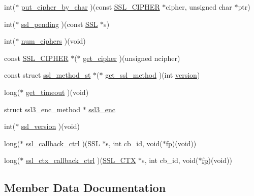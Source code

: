 \begin{DoxyCompactItemize}
int($\ast$ \hyperlink{structssl__method__st_a625829ff35be4426d905e44ea04024cf}{put\+\_\+cipher\+\_\+by\+\_\+char} )(const \hyperlink{ssl_8h_a548d7a5d565a9e0e9bd45c49f8c95701}{S\+S\+L\+\_\+\+C\+I\+P\+H\+ER} $\ast$cipher, unsigned char $\ast$ptr)
\item 
int($\ast$ \hyperlink{structssl__method__st_a8fd510a866d8754bfd60e897ccb8d3b4}{ssl\+\_\+pending} )(const \hyperlink{ossl__typ_8h_a71f21e09bf365489dab9d85bd4785e24}{S\+SL} $\ast$s)
\item 
int($\ast$ \hyperlink{structssl__method__st_ad67301b9f432dca1d82eda0a2a73d402}{num\+\_\+ciphers} )(void)
\item 
const \hyperlink{ssl_8h_a548d7a5d565a9e0e9bd45c49f8c95701}{S\+S\+L\+\_\+\+C\+I\+P\+H\+ER} $\ast$($\ast$ \hyperlink{structssl__method__st_aa5b037fbac753dc98291d099d817a072}{get\+\_\+cipher} )(unsigned ncipher)
\item 
const struct \hyperlink{structssl__method__st}{ssl\+\_\+method\+\_\+st} $\ast$($\ast$ \hyperlink{structssl__method__st_a601499546a57b7fc73461cca2588a316}{get\+\_\+ssl\+\_\+method} )(int \hyperlink{structssl__method__st_a1d231051899c943c03267d9ede6d2488}{version})
\item 
long($\ast$ \hyperlink{structssl__method__st_a5a153fd1d3f82198c14ceca526c07efa}{get\+\_\+timeout} )(void)
\item 
struct ssl3\+\_\+enc\+\_\+method $\ast$ \hyperlink{structssl__method__st_aa9b5c4c60c391bc6771bd035aa10ce0a}{ssl3\+\_\+enc}
\item 
int($\ast$ \hyperlink{structssl__method__st_a84b47953e71129319b367394a6daca4b}{ssl\+\_\+version} )(void)
\item 
long($\ast$ \hyperlink{structssl__method__st_ac8ad5e3ad9b93cad8439c0af2c280c56}{ssl\+\_\+callback\+\_\+ctrl} )(\hyperlink{ossl__typ_8h_a71f21e09bf365489dab9d85bd4785e24}{S\+SL} $\ast$s, int cb\+\_\+id, void($\ast$\hyperlink{conf_8h_aa065f30aa9f5f9a42132c82c787ee70b}{fp})(void))
\item 
long($\ast$ \hyperlink{structssl__method__st_a993fb1170221e955a38978690bbfde45}{ssl\+\_\+ctx\+\_\+callback\+\_\+ctrl} )(\hyperlink{ossl__typ_8h_a1a21892c1193ee6eb572c2c72d3924ca}{S\+S\+L\+\_\+\+C\+TX} $\ast$s, int cb\+\_\+id, void($\ast$\hyperlink{conf_8h_aa065f30aa9f5f9a42132c82c787ee70b}{fp})(void))
\end{DoxyCompactItemize}


\subsection{Member Data Documentation}
